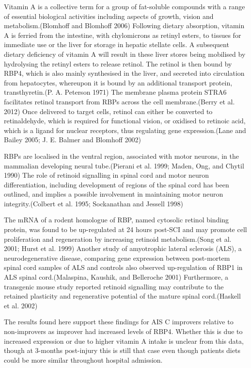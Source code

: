 \documentclass[9pt,lineno]{elife}
\begin{document}
Vitamin A is a collective term for a group of fat-soluble compounds with a range of essential biological activities including aspects of growth, vision and metabolism.(Blomhoff and Blomhoff 2006)
Following dietary absorption, vitamin A is ferried from the intestine, with chylomicrons as retinyl esters, to tissues for immediate use or the liver for storage in hepatic stellate cells.
A subsequent dietary deficiency of vitamin A will result in these liver stores being mobilised by hydrolysing the retinyl esters to release retinol.
The retinol is then bound by RBP4, which is also mainly synthesised in the liver, and secreted into circulation from hepatocytes, whereupon it is bound by an additional transport protein, transthyretin.(P. A. Peterson 1971)
The membrane plasma protein STRA6 facilitates retinol transport from RBPs across the cell membrane.(Berry et al. 2012)
Once delivered to target cells, retinol can either be converted to retinaldehyde, which is required for functional vision, or oxidised to retinoic acid, which is a ligand for nuclear receptors, thus regulating gene expression.(Lane and Bailey 2005; J. E. Balmer and Blomhoff 2002)

RBPs are localised in the ventral region, associated with motor neurons, in the mammalian developing neural tube.(Pierani et al. 1999; Maden, Ong, and Chytil 1990)
The role of retinoid signalling in spinal cord and motor neuron differentiation, including development of regions of the spinal cord has been outlined, and implies a possible involvement in maintaining motor neuron integrity.(Colbert et al. 1995; Sockanathan and Jessell 1998)

The mRNA of a rodent homologue of RBP, named cytosolic retinol binding protein, was found to be up-regulated at 24 hours post-SCI and may promote cell proliferation and regeneration by increasing retinoid metabolism.(Song et al. 2001; Hurst et al. 1999)
Another study of amyotrophic lateral sclerosis (ALS), a neurodegenerative disease, comparing gene expression between post-mortem spinal cord samples of ALS and controls also observed up-regulation of RBP1 in ALS spinal cord.(Malaspina, Kaushik, and Belleroche 2001)
Furthermore, a transgenic mouse study reported retinoid signalling may contribute to the retained plasticity and regenerative potential of the mature spinal cord.(Haskell et al. 2002)

The results found here support these findings for AIS C improvers relative to non-improvers as improver had increased levels of RBP4.
Whether this is due to increased expression or due to higher vitamin A intake is unclear from this data, though at 3-months post-injury this is still that case even though patients diets could be more similar throughout hospital admission.
\end{document}
